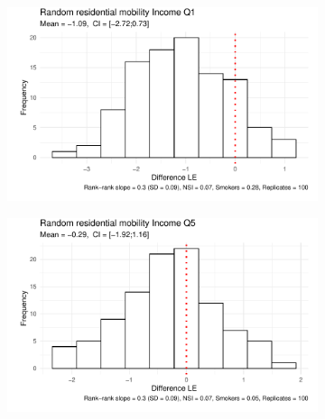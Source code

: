 \begin{figure}[htp]
     \begin{subfigure}[b]{0.50\textwidth}
         \centering
         \includegraphics[width=\textwidth]{plots/microsimulation/microsimulation_2_1.pdf}
     \end{subfigure}%
     \begin{subfigure}[b]{0.50\textwidth}
         \centering
         \includegraphics[width=\textwidth]{plots/microsimulation/microsimulation_2_5.pdf}
     \end{subfigure}\vspace{5mm}
     

\end{figure}
